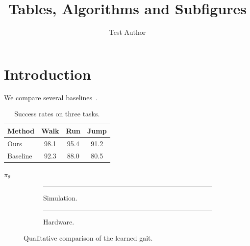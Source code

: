 \documentclass[twocolumn]{article}
\title{Tables, Algorithms and Subfigures}
\author{Test Author}
\begin{document}
\maketitle
\section{Introduction}
We compare several baselines~\cite{smith2020}.
\begin{table}[t]
\centering
\caption{Success rates on three tasks.}
\begin{tabular}{lccc}
\toprule
Method & Walk & Run & Jump \\
\midrule
Ours & 98.1 & 95.4 & 91.2 \\
Baseline & 92.3 & 88.0 & 80.5 \\
\bottomrule
\end{tabular}
\end{table}
\begin{algorithm}[t]
\caption{Training procedure}
\Return $\pi_\theta$\;
\end{algorithm}
\begin{figure}[t]
\centering
\begin{subfigure}{0.45\linewidth}\centering
\rule{2cm}{1cm}
\caption{Simulation.}
\end{subfigure}
\begin{subfigure}{0.45\linewidth}\centering
\rule{2cm}{1cm}
\caption{Hardware.}
\end{subfigure}
\caption{Qualitative comparison of the learned gait.}
\end{figure}


\end{document}
